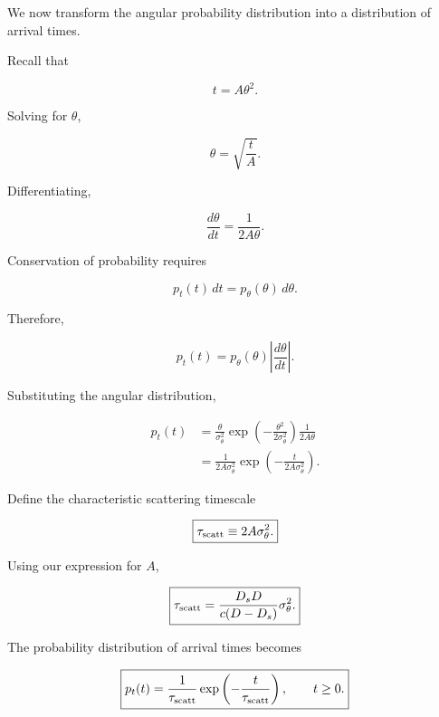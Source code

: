 We now transform the angular probability distribution
into a distribution of arrival times.

Recall that

\begin{equation}
t=A\theta^2.
\end{equation}

Solving for $\theta$,

\begin{equation}
\theta=\sqrt{\frac{t}{A}}.
\end{equation}

Differentiating,

\begin{equation}
\frac{d\theta}{dt}
=
\frac{1}{2A\theta}.
\end{equation}

Conservation of probability requires

\begin{equation}
p_t(t)\,dt=p_\theta(\theta)\,d\theta.
\end{equation}

Therefore,

\begin{equation}
p_t(t)
=
p_\theta(\theta)
\left|\frac{d\theta}{dt}\right|.
\end{equation}

Substituting the angular distribution,

\begin{align}
p_t(t)
&=
\frac{\theta}{\sigma_\theta^2}
\exp\left(
-\frac{\theta^2}{2\sigma_\theta^2}
\right)
\frac{1}{2A\theta}\\
&=
\frac{1}{2A\sigma_\theta^2}
\exp\left(
-\frac{t}{2A\sigma_\theta^2}
\right).
\end{align}

Define the characteristic scattering timescale

\begin{equation}
\boxed{
\tau_{\rm scatt}
\equiv 2A\sigma_\theta^2.
}
\end{equation}

Using our expression for $A$,

\begin{equation}
\boxed{
\tau_{\rm scatt}
=
\frac{D_sD}{c(D-D_s)}
\sigma_\theta^2.
}
\end{equation}

The probability distribution of arrival times becomes

\begin{equation}
\boxed{
p_t(t)
=
\frac{1}{\tau_{\rm scatt}}
\exp\left(-\frac{t}{\tau_{\rm scatt}}\right),
\qquad t\geq0.
}
\end{equation}

